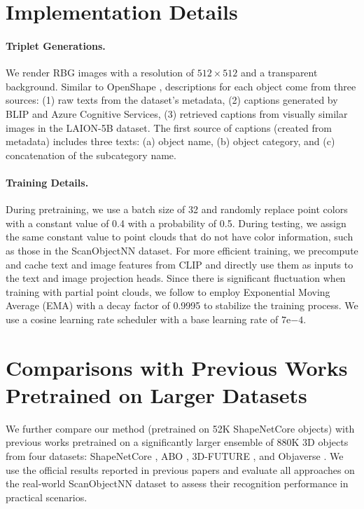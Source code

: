 \vspace{-5mm}
\section{Implementation Details}
\paragraph{Triplet Generations.} We render RBG images with a resolution of $512 \times 512$ and a transparent background. Similar to OpenShape \cite{openshape}, descriptions for each object come from three sources: (1) raw texts from the dataset's metadata, (2) captions generated by BLIP \cite{blip} and Azure Cognitive Services, (3) retrieved captions from visually similar images in the LAION-5B \cite{laion_5b} dataset. The first source of captions (created from metadata) includes three texts: (a) object name, (b) object category, and (c) concatenation of the subcategory name. 

\paragraph{Training Details.} During pretraining, we use a batch size of 32 and randomly replace point colors with a constant value of 0.4 with a probability of 0.5. During testing, we assign the same constant value to point clouds that do not have color information, such as those in the ScanObjectNN \cite{scanobjectnn} dataset. For more efficient training, we precompute and cache text and image features from CLIP \cite{2dclip} and directly use them as inputs to the text and image projection heads. Since there is significant fluctuation when training with partial point clouds, we follow \cite{mixcon3d} to employ Exponential Moving Average (EMA) \cite{ema} with a decay factor of 0.9995 to stabilize the training process. We use a cosine learning rate scheduler with a base learning rate of $7\mathrm{e}{-4}$.





\section{Comparisons with Previous Works Pretrained on Larger Datasets}
We further compare our method (pretrained on 52K ShapeNetCore \cite{shapenet} objects) with previous works pretrained on a significantly larger ensemble of 880K 3D objects from four datasets: ShapeNetCore \cite{shapenet}, ABO \cite{abo}, 3D-FUTURE \cite{3dfuture}, and Objaverse \cite{objaverse}. We use the official results reported in previous papers and evaluate all approaches on the real-world ScanObjectNN \cite{scanobjectnn} dataset to assess their recognition performance in practical scenarios.

